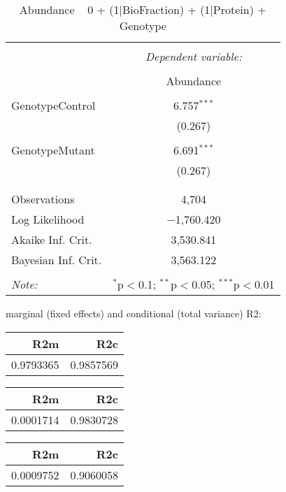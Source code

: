 \documentclass[11pt]{report}
\begin{document}
\begin{table}[!htbp] \centering 
  \caption{Abundance ~ 0 + (1|BioFraction) + (1|Protein) + Genotype} 
  \label{} 
\begin{tabular}{@{\extracolsep{5pt}}lc} 
\\[-1.8ex]\hline 
\hline \\[-1.8ex] 
 & \multicolumn{1}{c}{\textit{Dependent variable:}} \\ 
\cline{2-2} 
\\[-1.8ex] & Abundance \\ 
\hline \\[-1.8ex] 
 GenotypeControl & 6.757$^{***}$ \\ 
  & (0.267) \\ 
  & \\ 
 GenotypeMutant & 6.691$^{***}$ \\ 
  & (0.267) \\ 
  & \\ 
\hline \\[-1.8ex] 
Observations & 4,704 \\ 
Log Likelihood & $-$1,760.420 \\ 
Akaike Inf. Crit. & 3,530.841 \\ 
Bayesian Inf. Crit. & 3,563.122 \\ 
\hline 
\hline \\[-1.8ex] 
\textit{Note:}  & \multicolumn{1}{r}{$^{*}$p$<$0.1; $^{**}$p$<$0.05; $^{***}$p$<$0.01} \\ 
\end{tabular} 
\end{table} 
marginal (fixed effects) and conditional (total variance) R2:

\begin{tabular}{r|r}
\hline
R2m & R2c\\
\hline
0.9793365 & 0.9857569\\
\hline
\end{tabular}

\begin{tabular}{r|r}
\hline
R2m & R2c\\
\hline
0.0001714 & 0.9830728\\
\hline
\end{tabular}

\begin{tabular}{r|r}
\hline
R2m & R2c\\
\hline
0.0009752 & 0.9060058\\
\hline
\end{tabular}
\end{document}
